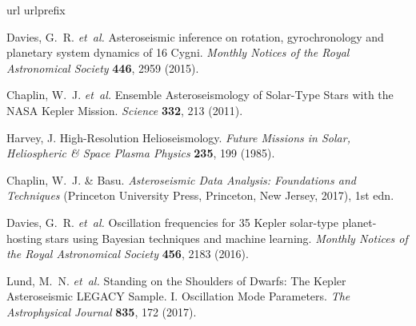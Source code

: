 \documentclass[12pt]{article}
\begin{document}
\begin{thebibliography}{10}
	\expandafter\ifx\csname url\endcsname\relax
	\def\url#1{\texttt{#1}}\fi
	\expandafter\ifx\csname urlprefix\endcsname\relax\def\urlprefix{URL }\fi
	\providecommand{\bibinfo}[2]{#2}
	\providecommand{\eprint}[2][]{\url{#2}}
	
	\bibinfo{author}{Davies, G.~R.} \emph{et~al.}
	\newblock \bibinfo{title}{Asteroseismic inference on rotation, gyrochronology
		and planetary system dynamics of 16 {{Cygni}}}.
	\newblock \emph{\bibinfo{journal}{Monthly Notices of the Royal Astronomical
			Society}} \textbf{\bibinfo{volume}{446}}, \bibinfo{pages}{2959}
	(\bibinfo{year}{2015}).
	
	\bibinfo{author}{Chaplin, W.~J.} \emph{et~al.}
	\newblock \bibinfo{title}{Ensemble {{Asteroseismology}} of {{Solar}}-{{Type
				Stars}} with the {{NASA Kepler Mission}}}.
	\newblock \emph{\bibinfo{journal}{Science}} \textbf{\bibinfo{volume}{332}},
	\bibinfo{pages}{213} (\bibinfo{year}{2011}).
	
	\bibinfo{author}{Harvey, J.}
	\newblock \bibinfo{title}{High-{{Resolution Helioseismology}}}.
	\newblock \emph{\bibinfo{journal}{Future Missions in Solar, Heliospheric \&
			Space Plasma Physics}} \textbf{\bibinfo{volume}{235}}, \bibinfo{pages}{199}
	(\bibinfo{year}{1985}).
	
	\bibinfo{author}{Chaplin, W.~J.} \& \bibinfo{author}{Basu}.
	\newblock \emph{\bibinfo{title}{Asteroseismic {{Data Analysis}}:
			{{Foundations}} and {{Techniques}}}} (\bibinfo{publisher}{{Princeton
			University Press}}, \bibinfo{address}{{Princeton, New Jersey}},
	\bibinfo{year}{2017}), \bibinfo{edition}{1st} edn.
	
	\bibinfo{author}{Davies, G.~R.} \emph{et~al.}
	\newblock \bibinfo{title}{Oscillation frequencies for 35 {{Kepler}} solar-type
		planet-hosting stars using {{Bayesian}} techniques and machine learning}.
	\newblock \emph{\bibinfo{journal}{Monthly Notices of the Royal Astronomical
			Society}} \textbf{\bibinfo{volume}{456}}, \bibinfo{pages}{2183}
	(\bibinfo{year}{2016}).
	
	\bibinfo{author}{Lund, M.~N.} \emph{et~al.}
	\newblock \bibinfo{title}{Standing on the {{Shoulders}} of {{Dwarfs}}: The
		{{Kepler Asteroseismic LEGACY Sample}}. {{I}}. {{Oscillation Mode
				Parameters}}}.
	\newblock \emph{\bibinfo{journal}{The Astrophysical Journal}}
	\textbf{\bibinfo{volume}{835}}, \bibinfo{pages}{172} (\bibinfo{year}{2017}).
	

\end{thebibliography}
\end{document}
